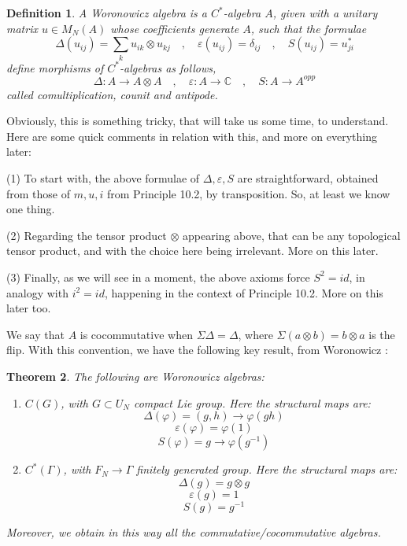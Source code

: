 \documentclass[12pt]{amsbook}
\newtheorem{theorem}{Theorem}[chapter]
\newtheorem{definition}[theorem]{Definition}
\begin{document}
\begin{definition}
A Woronowicz algebra is a $C^*$-algebra $A$, given with a unitary matrix $u\in M_N(A)$ whose coefficients generate $A$, such that the formulae
$$\Delta(u_{ij})=\sum_ku_{ik}\otimes u_{kj}\quad,\quad
\varepsilon(u_{ij})=\delta_{ij}\quad,\quad 
S(u_{ij})=u_{ji}^*$$
define morphisms of $C^*$-algebras as follows,
$$\Delta:A\to A\otimes A\quad,\quad 
\varepsilon:A\to\mathbb C\quad,\quad 
S:A\to A^{opp}$$
called comultiplication, counit and antipode.
\end{definition}

Obviously, this is something tricky, that will take us some time, to understand. Here are some quick comments in relation with this, and more on everything later:

\bigskip

(1) To start with, the above formulae of $\Delta,\varepsilon,S$ are straightforward, obtained from those of $m,u,i$ from Principle 10.2, by transposition. So, at least we know one thing.

\bigskip

(2) Regarding the tensor product $\otimes$ appearing above, that can be any topological tensor product, and with the choice here being irrelevant. More on this later. 

\bigskip

(3) Finally, as we will see in a moment, the above axioms force $S^2=id$, in analogy with $i^2=id$, happening in the context of Principle 10.2. More on this later too.

\bigskip

We say that $A$ is cocommutative when $\Sigma\Delta=\Delta$, where $\Sigma(a\otimes b)=b\otimes a$ is the flip. With this convention, we have the following key result, from Woronowicz \cite{wo1}:


\begin{theorem}
The following are Woronowicz algebras:
\begin{enumerate}
\item $C(G)$, with $G\subset U_N$ compact Lie group. Here the structural maps are:
$$\Delta(\varphi)=(g,h)\to \varphi(gh)$$
$$\varepsilon(\varphi)=\varphi(1)$$
$$S(\varphi)=g\to\varphi(g^{-1})$$

\item $C^*(\Gamma)$, with $F_N\to\Gamma$ finitely generated group. Here the structural maps are:
$$\Delta(g)=g\otimes g$$
$$\varepsilon(g)=1$$
$$S(g)=g^{-1}$$

\end{enumerate}
Moreover, we obtain in this way all the commutative/cocommutative algebras.
\end{theorem}
\end{document}
